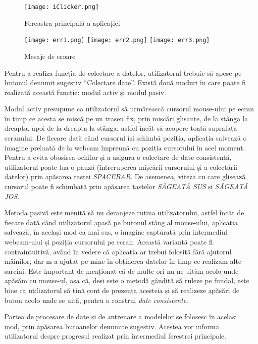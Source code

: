 \begin{figure}[ht]
    \centering
    \texttt{[image: iClicker.png]}
    \caption{Fereastra principală a aplicației}
\end{figure}

\begin{figure}[ht]
    \centering
    \texttt{[image: err1.png]}
    \texttt{[image: err2.png]}
    \texttt{[image: err3.png]}
    \caption{Mesaje de eroare}
\end{figure}

Pentru a realiza funcția de colectare a datelor, utilizatorul trebuie să apese pe butonul denumit sugestiv ``Colectare date''.
Există două moduri în care poate fi realizată această funcție: modul activ și modul pasiv.

Modul activ presupune ca utilizatorul să urmărească cursorul mouse-ului pe ecran în timp ce acesta se mișcă pe un traseu fix, prin mișcări glisante, de la stânga la dreapta, apoi de la dreapta la stânga, astfel încât să acopere toată suprafața ecranului.
De fiecare dată când cursorul își schimbă poziția, aplicația salvează o imagine preluată de la webcam împreună cu poziția cursorului în acel moment.
Pentru a evita obosirea ochilor și a asigura o colectare de date consistentă, utilizatorul poate lua o pauză (întreruperea mișcării cursorului și a colectării datelor) prin apăsarea tastei \emph{SPACEBAR}.
De asemenea, viteza cu care glisează cursorul poate fi schimbată prin apăsarea tastelor \emph{SĂGEATĂ SUS} și \emph{SĂGEATĂ JOS}.

Metoda pasivă este menită să nu deranjeze rutina utilizatorului, astfel încât de fiecare dată când utilizatorul apasă pe butonul stâng al mouse-ului, aplicația salvează, în același mod ca mai sus, o imagine capturată prin intermediul webcam-ului și poziția cursorului pe ecran.
Această variantă poate fi contraintuitivă, având în vedere că aplicația ar trebui folosită fără ajutorul mâinilor, dar m-a ajutat pe mine în obținerea datelor în timp ce realizam alte sarcini.
Este important de menționat că de multe ori nu ne uităm acolo unde apăsăm cu mouse-ul, așa că, deși este o metodă gândită să ruleze pe fundal, este bine ca utilizatorul să țină cont de prezența acesteia și să realizeze apăsări de buton acolo unde se uită, pentru a construi \emph{date consistente}.

Partea de procesare de date și de antrenare a modelelor se folosesc în același mod, prin apăsarea butoanelor denumite sugestiv.
Acestea vor informa utilizatorul despre progresul realizat prin intermediul ferestrei principale.

